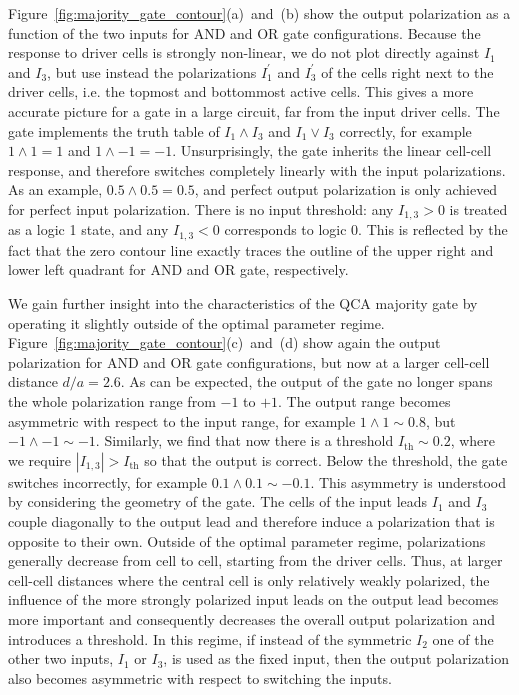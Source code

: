 Figure~\ref{fig:majority_gate_contour}(a)~and~(b) show the output polarization as
a function of the two inputs for AND and OR gate configurations. Because the
response to driver cells is strongly non-linear, we do not plot directly against
$I_1$ and $I_3$, but use instead the polarizations $I_1^{\prime}$ and
$I_3^{\prime}$ of the cells right next to the driver cells, i.e.  the topmost
and bottommost active cells. This gives a more accurate picture for a gate in a
large circuit, far from the input driver cells. The gate implements the truth
table of $I_1 \land I_3$ and $I_1 \lor I_3$ correctly, for example $1 \land 1 =
1$ and $1 \land -1 = -1$. Unsurprisingly, the gate inherits the linear cell-cell
response, and therefore switches completely linearly with the input
polarizations. As an example, $0.5 \land 0.5 = 0.5$, and perfect output
polarization is only achieved for perfect input polarization. There is no input
threshold: any $I_{1,3} > 0$ is treated as a logic 1 state, and any $I_{1,3} <
0$ corresponds to logic 0. This is reflected by the fact that the zero contour
line exactly traces the outline of the upper right and lower left quadrant for
AND and OR gate, respectively.

We gain further insight into the characteristics of the QCA majority gate by
operating it slightly outside of the optimal parameter regime.
Figure~\ref{fig:majority_gate_contour}(c)~and~(d) show again the output
polarization for AND and OR gate configurations, but now at a larger cell-cell
distance $d/a = 2.6$. As can be expected, the output of the gate no longer spans
the whole polarization range from $-1$ to $+1$. The output range becomes
asymmetric with respect to the input range, for example $1 \land 1 \sim 0.8$,
but $-1 \land -1 \sim -1$. Similarly, we find that now there is a threshold
$I_{\textrm{th}} \sim 0.2$, where we require $\left| I_{1,3} \right| >
I_{\textrm{th}}$ so that the output is correct. Below the threshold, the gate
switches incorrectly, for example $0.1 \land 0.1 \sim - 0.1$. This asymmetry is
understood by considering the geometry of the gate. The cells of the input leads
$I_1$ and $I_3$ couple diagonally to the output lead and therefore induce a
polarization that is opposite to their own. Outside of the optimal parameter
regime, polarizations generally decrease from cell to cell, starting from the
driver cells. Thus, at larger cell-cell distances where the central cell is only
relatively weakly polarized, the influence of the more strongly polarized input
leads on the output lead becomes more important and consequently decreases the
overall output polarization and introduces a threshold. In this regime, if
instead of the symmetric $I_2$ one of the other two inputs, $I_1$ or $I_3$, is
used as the fixed input, then the output polarization also becomes asymmetric
with respect to switching the inputs.

